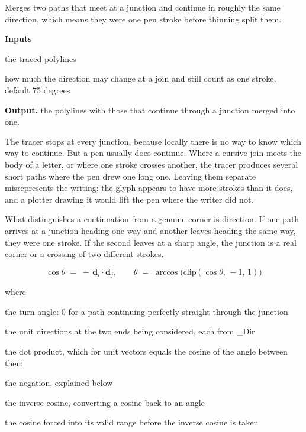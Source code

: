 Merges two paths that meet at a junction and continue in roughly the same direction, which means they were one pen stroke before thinning split them.




\noindent\textbf{Inputs}
\begin{description}[leftmargin=2.2em,style=nextline,font=\normalfont\ttfamily]\setlength\itemsep{1pt}
  \item[{chains}] \normalfont the traced polylines
  \item[{maxAngleDeg}] \normalfont how much the direction may change at a join and still count as one stroke, default 75 degrees
\end{description}

\noindent\textbf{Output.} the polylines with those that continue through a junction merged into one.


The tracer stops at every junction, because locally there is no way to know which way to continue. But a pen usually does continue. Where a cursive join meets the body of a letter, or where one stroke crosses another, the tracer produces several short paths where the pen drew one long one. Leaving them separate misrepresents the writing: the glyph appears to have more strokes than it does, and a plotter drawing it would lift the pen where the writer did not.


What distinguishes a continuation from a genuine corner is direction. If one path arrives at a junction heading one way and another leaves heading the same way, they were one stroke. If the second leaves at a sharp angle, the junction is a real corner or a crossing of two different strokes.


\begin{equation}
\cos\theta \;=\; -\,\mathbf{d}_i \cdot \mathbf{d}_j, \qquad \theta \;=\; \arccos\big(\mathrm{clip}(\cos\theta,\,-1,\,1)\big)
\end{equation}

\noindent where
\begin{description}[leftmargin=2.4em,style=nextline,font=\normalfont\ttfamily]\setlength\itemsep{1pt}
  \item[{$\theta$}] \normalfont the turn angle: 0 for a path continuing perfectly straight through the junction
  \item[{$\mathbf{d}_i,\, \mathbf{d}_j$}] \normalfont the unit directions at the two ends being considered, each from \_Dir
  \item[{$\cdot$}] \normalfont the dot product, which for unit vectors equals the cosine of the angle between them
  \item[{$-$}] \normalfont the negation, explained below
  \item[{$\arccos$}] \normalfont the inverse cosine, converting a cosine back to an angle
  \item[{$\mathrm{clip}(\cdot,-1,1)$}] \normalfont the cosine forced into its valid range before the inverse cosine is taken
\end{description}

